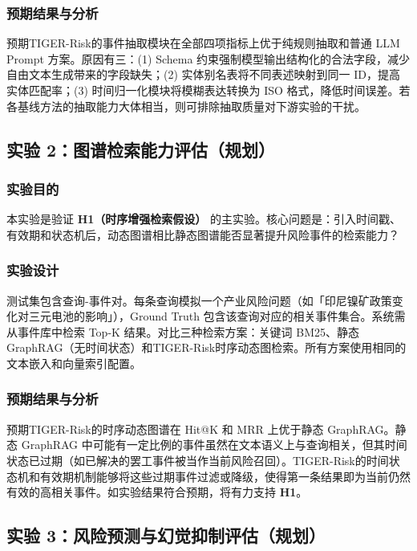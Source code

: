 \documentclass[12pt,a4paper]{article}
\newcommand{\projectshort}{TIGER-Risk}
\newcommand{\term}[1]{\textbf{#1}}
\begin{document}
\subsubsection{预期结果与分析}

预期\projectshort 的事件抽取模块在全部四项指标上优于纯规则抽取和普通 LLM Prompt 方案。原因有三：(1) Schema 约束强制模型输出结构化的合法字段，减少自由文本生成带来的字段缺失；(2) 实体别名表将不同表述映射到同一 ID，提高实体匹配率；(3) 时间归一化模块将模糊表达转换为 ISO 格式，降低时间误差。若各基线方法的抽取能力大体相当，则可排除抽取质量对下游实验的干扰。

\subsection{实验 2：图谱检索能力评估（规划）}
\label{sec:exp-retrieval}

\subsubsection{实验目的}

本实验是验证 \term{H1（时序增强检索假设）} 的主实验。核心问题是：引入时间戳、有效期和状态机后，动态图谱相比静态图谱能否显著提升风险事件的检索能力？

\subsubsection{实验设计}

测试集包含查询-事件对。每条查询模拟一个产业风险问题（如「印尼镍矿政策变化对三元电池的影响」），Ground Truth 包含该查询对应的相关事件集合。系统需从事件库中检索 Top-K 结果。对比三种检索方案：关键词 BM25、静态 GraphRAG（无时间状态）和\projectshort 时序动态图检索。所有方案使用相同的文本嵌入和向量索引配置。

\subsubsection{预期结果与分析}

预期\projectshort 的时序动态图谱在 Hit@K 和 MRR 上优于静态 GraphRAG。静态 GraphRAG 中可能有一定比例的事件虽然在文本语义上与查询相关，但其时间状态已过期（如已解决的罢工事件被当作当前风险召回）。\projectshort 的时间状态机和有效期机制能够将这些过期事件过滤或降级，使得第一条结果即为当前仍然有效的高相关事件。如实验结果符合预期，将有力支持 \textbf{H1}。

\subsection{实验 3：风险预测与幻觉抑制评估（规划）}
\label{sec:exp-prediction}
\end{document}
